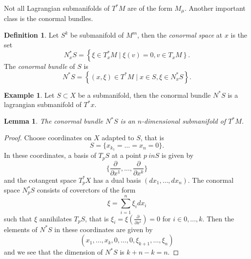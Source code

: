 \documentclass{article}
\numberwithin{theorem}{section}
\newtheorem{lemma}[theorem]{Lemma} %
\theoremstyle{definition}
\newtheorem{definition}[theorem]{Definition}
\newtheorem{example}[theorem]{Example}
\begin{document}
Not all Lagrangian submanifolds of $T^*M$ are of the form $M_\mu$. Another important class is the conormal bundles.

\begin{definition}
    Let $S^k$ be submanifold of $M^m$, then the \textit{conormal space} at $x$ is the set
    \begin{equation*}
        N_x^* S=\left\{\xi \in T_x^* M \mid \xi(v)=0\right., \left.v \in T_x M\right\}.
    \end{equation*}
    The \textit{conormal bundle} of $S$ is 
    \begin{equation*}
        N^* S=\left\{(x, \xi) \in T^* M \mid x \in S, \xi \in N_x^* S\right\}.
    \end{equation*}
\end{definition}
\begin{example}
    Let $S \subset X$ be a submanifold, then the conormal bundle $N^*S$ is a lagrangian submanifold of $T^*x$.
\end{example}

\begin{lemma}
    The conormal bundle $N^*S$ is an $n$-dimensional submanifold of $T^*M$.
\end{lemma}

\begin{proof}
    Choose coordinates on $X$ adapted to $S$, that is 
    \begin{equation*}
        S = \{ x_{k_1} = \ldots = x_n = 0\}.
    \end{equation*} 
    In these coordinates, a basis of $T_pS$ at a point $p \ in S$ is given by 
    \begin{equation*}
        \{ \frac{\partial}{\partial x^1}, \dots, \frac{\partial}{\partial x^k} \}
    \end{equation*}
    and the cotangent space $T_p^*X$ has a dual basis $(dx_1, \ldots, dx_n)$. The conormal space $N_p^*S$ consists of coverctors of the form 
    \begin{equation*}
        \xi = \sum_{i=1}^{n} \xi_i dx_i
    \end{equation*}
    such that $\xi$ annihilates $T_pS$, that is $\xi_i = \xi(\frac{\partial}{\partial x^i}) = 0$ for $i \in 0,\ldots, k$.
    Then the elements of $N^*S$ in these coordinates are given by 
    \begin{equation*}
        (x_1, \ldots, x_k, 0, \ldots, 0, \xi_{k+1}, \ldots, \xi_n)
    \end{equation*}
    and we see that the dimension of $N^*S$ is $k + n-k = n$.
\end{proof}
\end{document}
